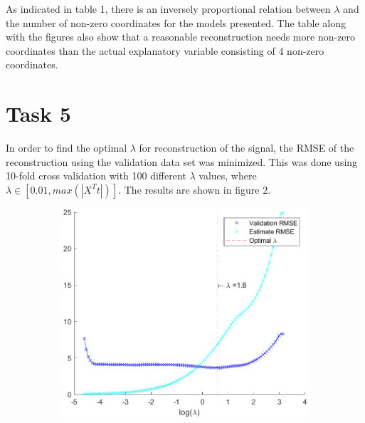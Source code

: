 \documentclass{article}
\begin{document}
As indicated in table 1, there is an inversely proportional relation between $\lambda$ and the number of non-zero coordinates for the models presented. The table along with the figures also show that a reasonable reconstruction needs more non-zero coordinates than the actual explanatory variable consisting of 4 non-zero coordinates.

\section{Task 5}
In order to find the optimal $\lambda$ for reconstruction of the signal, the RMSE of the reconstruction using the validation data set was minimized. This was done using 10-fold cross validation with 100 different $\lambda$ values, where $\lambda \in [0.01, max(|X^T t|)]$. The results are shown in figure 2.
\begin{figure}[h]
\centering
   \begin{subfigure}{0.49\linewidth}
   \centering
   \includegraphics[width=\linewidth]{task51.png}
   \caption{}
   \label{fig:1} 
\end{subfigure}
\hfill
\begin{subfigure}{0.49\linewidth}
   \centering

\end{subfigure}
\end{figure}
\end{document}
